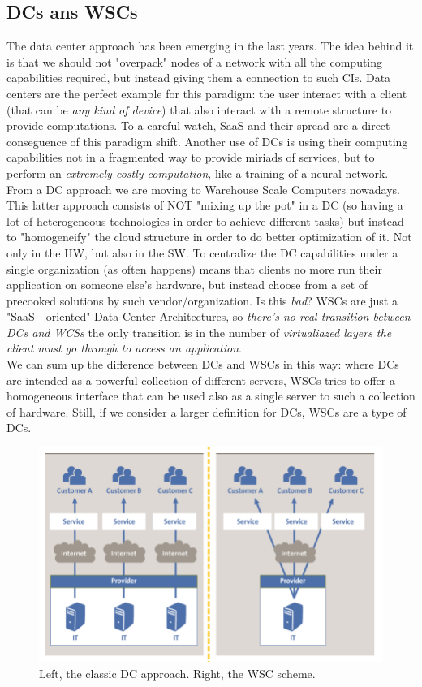 \documentclass[10pt,a4paper]{article}
\begin{document}
			\subsection{DCs ans WSCs}
				The data center approach has been emerging in the last years. The idea behind it is that we should not "overpack" nodes of a network with all the computing capabilities required, but instead giving them a connection to such CIs. Data centers are the perfect example for this paradigm: the user interact with a client (that can be \emph{any kind of device}) that also interact with a remote structure to provide computations. To a careful watch, SaaS and their spread are a direct conseguence of this paradigm shift. Another use of DCs is using their computing capabilities not in a fragmented way to provide miriads of services, but to perform an \emph{extremely costly computation}, like a training of a neural network.\\
				From a DC approach we are moving to Warehouse Scale Computers nowadays. This latter approach consists of NOT "mixing up the pot" in a DC (so having a lot of heterogeneous technologies in order to achieve different tasks) but instead to "homogeneify" the cloud structure in order to do better optimization of it. Not only in the HW, but also in the SW. To centralize the DC capabilities under a single organization (as often happens) means that clients no more run their application on someone else's hardware, but instead choose from a set of precooked solutions by such vendor/organization. Is this \emph{bad}? WSCs are just a "SaaS - oriented" Data Center Architectures, so \emph{there's no real transition between DCs and WCSs} the only transition is in the number of \emph{virtualiazed layers the client must go through to access an application}.\\
				We can sum up the difference between DCs and WSCs in this way: where DCs are intended as a powerful collection of different servers, WSCs tries to offer a homogeneous interface that can be used also as a single server to such a collection of hardware. Still, if we consider a larger definition for DCs, WSCs are a type of DCs. 
				\begin{figure}[H]
					\centering
					\includegraphics[width = \textwidth]{./images/wsc.png}
					\caption{Left, the classic DC approach. Right, the WSC scheme.}
				\end{figure}
				
\end{document}

